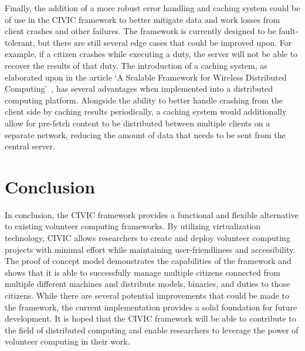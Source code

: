 \documentclass[11pt]{article}
\begin{document}
Finally, the addition of a more robust error handling and caching system could be of use in the CIVIC framework to better mitigate data and work losses from client crashes and other failures. The framework is currently designed to be fault-tolerant, but there are still several edge cases that could be improved upon. For example, if a citizen crashes while executing a duty, the server will not be able to recover the results of that duty. The introduction of a caching system, as elaborated upon in the article `A Scalable Framework for Wireless Distributed Computing'~\cite{Li2017}, has several advantages when implemented into a distributed computing platform. Alongside the ability to better handle crashing from the client side by caching results periodically, a caching system would additionally allow for pre-fetch content to be distributed between multiple clients on a separate network, reducing the amount of data that needs to be sent from the central server.

\section{Conclusion}

In conclusion, the CIVIC framework provides a functional and flexible alternative to existing volunteer computing frameworks. By utilizing virtualization technology, CIVIC allows researchers to create and deploy volunteer computing projects with minimal effort while maintaining user-friendliness and accessibility. The proof of concept model demonstrates the capabilities of the framework and shows that it is able to successfully manage multiple citizens connected from multiple different machines and distribute models, binaries, and duties to those citizens. While there are several potential improvements that could be made to the framework, the current implementation provides a solid foundation for future development. It is hoped that the CIVIC framework will be able to contribute to the field of distributed computing and enable researchers to leverage the power of volunteer computing in their work.


\newpage
\thispagestyle{empty}
\nocite{*} %
\renewcommand{\refname}{Bibliography} %

 
\end{document}
